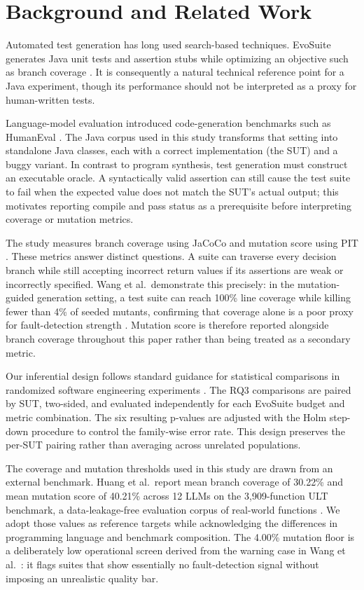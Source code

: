 \section{Background and Related Work}
\label{sec:related}

Automated test generation has long used search-based techniques. EvoSuite generates Java unit tests and assertion stubs while optimizing an objective such as branch coverage \cite{Tang_2024}. It is consequently a natural technical reference point for a Java experiment, though its performance should not be interpreted as a proxy for human-written tests.

Language-model evaluation introduced code-generation benchmarks such as HumanEval \cite{yuan2024junit}. The Java corpus used in this study transforms that setting into standalone Java classes, each with a correct implementation (the SUT) and a buggy variant. In contrast to program synthesis, test generation must construct an executable oracle. A syntactically valid assertion can still cause the test suite to fail when the expected value does not match the SUT's actual output; this motivates reporting compile and pass status as a prerequisite before interpreting coverage or mutation metrics.

The study measures branch coverage using JaCoCo \cite{Lu_2026} and mutation score using PIT \cite{Bouafif_2025}. These metrics answer distinct questions. A suite can traverse every decision branch while still accepting incorrect return values if its assertions are weak or incorrectly specified. Wang et al.\ demonstrate this precisely: in the mutation-guided generation setting, a test suite can reach 100\% line coverage while killing fewer than 4\% of seeded mutants, confirming that coverage alone is a poor proxy for fault-detection strength \cite{wang2026mutgen}. Mutation score is therefore reported alongside branch coverage throughout this paper rather than being treated as a secondary metric.

Our inferential design follows standard guidance for statistical comparisons in randomized software engineering experiments \cite{evaluating2024}. The RQ3 comparisons are paired by SUT, two-sided, and evaluated independently for each EvoSuite budget and metric combination. The six resulting p-values are adjusted with the Holm step-down procedure to control the family-wise error rate. This design preserves the per-SUT pairing rather than averaging across unrelated populations.

The coverage and mutation thresholds used in this study are drawn from an external benchmark. Huang et al.\ report mean branch coverage of 30.22\% and mean mutation score of 40.21\% across 12 LLMs on the 3,909-function ULT benchmark, a data-leakage-free evaluation corpus of real-world functions \cite{huang2026ult}. We adopt those values as reference targets while acknowledging the differences in programming language and benchmark composition. The 4.00\% mutation floor is a deliberately low operational screen derived from the warning case in Wang et al.\ \cite{wang2026mutgen}: it flags suites that show essentially no fault-detection signal without imposing an unrealistic quality bar.

